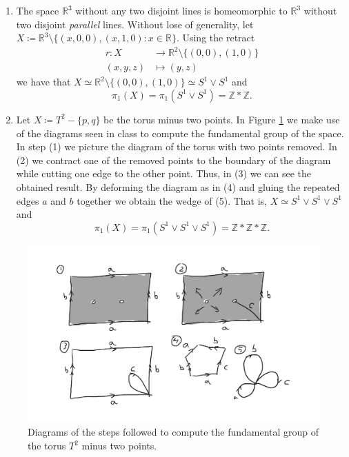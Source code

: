 \documentclass[11pt,a4paper]{article}
\newcommand{\R}{\mathbb R}
\begin{document}
\begin{enumerate}
  \item The space $\R^3 $ without any two disjoint lines is homeomorphic to $\R^3 $ without two disjoint {\it parallel} lines. Without lose of generality, let $ X \coloneq \R^3 \setminus \{(x, 0, 0), (x, 1, 0) : x \in \R\} $. Using the retract
  \begin{align*}
    r \colon X &\to \R^2 \setminus \{(0, 0), (1, 0)\} \\
    (x, y, z) &\mapsto (y, z)
  \end{align*}
  we have that $ X \simeq \R^2 \setminus \{(0, 0), (1, 0)\} \simeq S^1 \vee S^1 $ and
  $$
    \pi_1(X) = \pi_1(S^1 \vee S^1) = \mathbb Z * \mathbb Z.
  $$
  
  \item Let $ X \coloneq T^2 - \{p, q\} $ be the torus minus two points. In Figure \ref{fig:7d} we make use of the diagrams seen in class to compute the fundamental group of the space. In step (1) we picture the diagram of the torus with two points removed. In (2) we contract one of the removed points to the boundary of the diagram while cutting one edge to the other point. Thus, in (3) we can see the obtained result. By deforming the diagram as in (4) and gluing the repeated edges $a$ and $b$ together we obtain the wedge of (5). That is, $ X \simeq S^1 \vee S^1 \vee S^1$ and 
  $$
  \pi_1(X) = \pi_1(S^1 \vee S^1 \vee S^1) = \mathbb Z * \mathbb Z * \mathbb Z.
  $$
\end{enumerate}
\begin{figure}[h]
  \centering
  \includegraphics[width=15cm]{7d.pdf}
  \caption{Diagrams of the steps followed to compute the fundamental group of the torus $T^2$ minus two points.}
  \label{fig:7d}
\end{figure}
\end{document}
